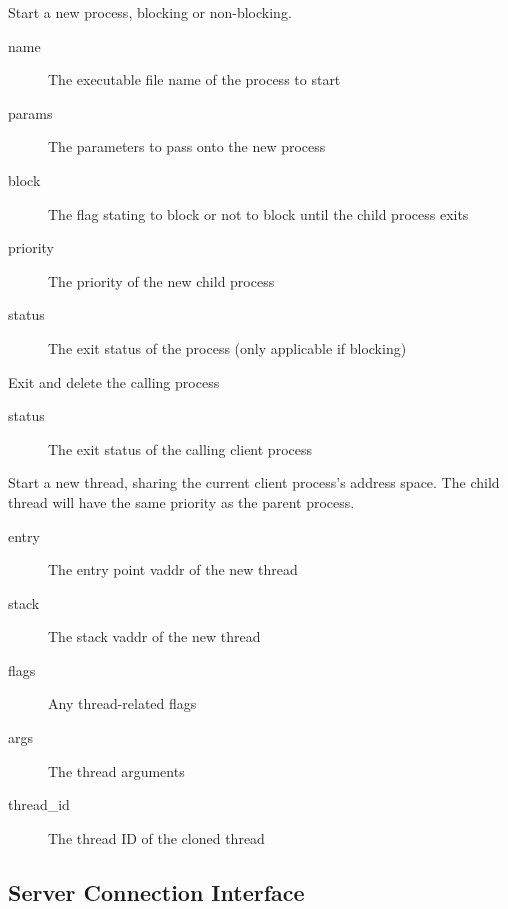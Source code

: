 \begin{description}
	\item {}
	Start a new process, blocking or non-blocking.
    \begin{description}
        \item [name] The executable file name of the process to start
        \item [params] The parameters to pass onto the new process
        \item [block] The flag stating to block or not to block until the child process exits
        \item [priority] The priority of the new child process
        \item [status] The exit status of the process (only applicable if blocking)
    \end{description}

    \item {}
    Exit and delete the calling process
    \begin{description}
        \item [status] The exit status of the calling client process
    \end{description}

    \item {}
    Start a new thread, sharing the current client process's address space. The child thread will have the same priority as the parent process.
    \begin{description}
        \item [entry] The entry point vaddr of the new thread
        \item [stack] The stack vaddr of the new thread
        \item [flags] Any thread-related flags
        \item [args] The thread arguments
        \item [thread\_id] The thread ID of the cloned thread
    \end{description}

\end{description}

\subsection{Server Connection Interface}

